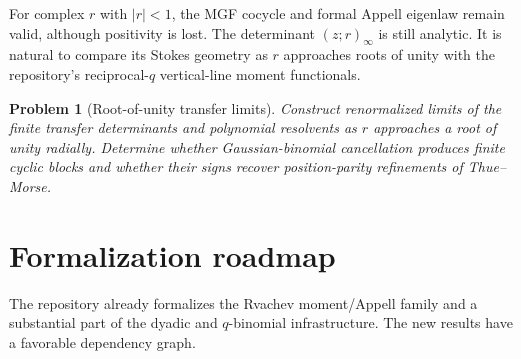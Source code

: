 \documentclass[11pt,a4paper]{article}
\newtheorem{problem}[theorem]{Problem}
\theoremstyle{definition}
\theoremstyle{remark}
\begin{document}
For complex $r$ with $|r|<1$, the MGF cocycle and formal Appell eigenlaw remain valid, although positivity is lost. The determinant $(z;r)_\infty$ is still analytic. It is natural to compare its Stokes geometry as $r$ approaches roots of unity with the repository's reciprocal-$q$ vertical-line moment functionals.

\begin{problem}[Root-of-unity transfer limits]
Construct renormalized limits of the finite transfer determinants and polynomial resolvents as $r$ approaches a root of unity radially. Determine whether Gaussian-binomial cancellation produces finite cyclic blocks and whether their signs recover position-parity refinements of Thue--Morse.
\end{problem}

\section{Formalization roadmap}
\label{sec:formalization}

The repository already formalizes the Rvachev moment/Appell family and a substantial part of the dyadic and $q$-binomial infrastructure. The new results have a favorable dependency graph.
\end{document}
